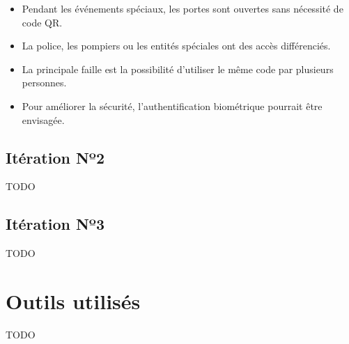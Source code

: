         \begin{itemize}
            \item Pendant les événements spéciaux, les portes sont ouvertes sans nécessité de code QR.
            \item La police, les pompiers ou les entités spéciales ont des accès différenciés.
            \item La principale faille est la possibilité d'utiliser le même code par plusieurs personnes.
            \item Pour améliorer la sécurité, l'authentification biométrique pourrait être envisagée.
        \end{itemize}

    \subsection{Itération Nº2}
        TODO
    \subsection{Itération Nº3}
        TODO

\section{Outils utilisés}
    TODO